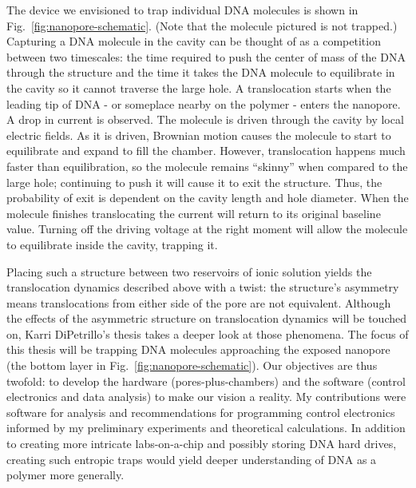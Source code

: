 \documentclass[aps,prl,preprint,groupedaddress]{revtex4}
\begin{document}
The device we envisioned to trap individual DNA molecules is shown in Fig.~\ref{fig:nanopore-schematic}.
(Note that the molecule pictured is not trapped.) Capturing a DNA molecule in the cavity can be thought of as a competition between two timescales: the time required to push the center of mass of the DNA through the structure and the time it takes the DNA molecule to equilibrate in the cavity so it cannot traverse the large hole.
A translocation starts when the leading tip of DNA  - or someplace nearby on the polymer - enters the nanopore.
A drop in current is observed.
The molecule is driven through the cavity by local electric fields.
As it is driven, Brownian motion causes the molecule to start to equilibrate and expand to fill the chamber.
However, translocation happens much faster than equilibration, so the molecule remains ``skinny'' when compared to the large hole; continuing to push it will cause it to exit the structure.
Thus, the probability of exit is dependent on the cavity length and hole diameter.
When the molecule finishes translocating the current will return to its original baseline value.
Turning off the driving voltage at the right moment will allow the molecule to equilibrate inside the cavity, trapping it.

Placing such a structure between two reservoirs of ionic solution yields the translocation dynamics described above with a twist: the structure’s asymmetry means translocations from either side of the pore are not equivalent.
Although the effects of the asymmetric structure on translocation dynamics will be touched on, Karri DiPetrillo's thesis takes a deeper look at those phenomena.
The focus of this thesis will be trapping DNA molecules approaching the exposed nanopore (the bottom layer in Fig.~\ref{fig:nanopore-schematic}).
Our objectives are thus twofold: to develop the hardware (pores-plus-chambers) and the software (control electronics and data analysis) to make our vision a reality.
My contributions were software for analysis and recommendations for programming control electronics informed by my preliminary experiments and theoretical calculations.
In addition to creating more intricate labs-on-a-chip and possibly storing DNA hard drives, creating such entropic traps would yield deeper understanding of DNA as a polymer more generally.

\end{document}
